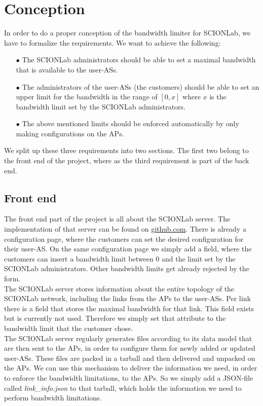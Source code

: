 \chapter{Conception}
In order to do a proper conception of the bandwidth limiter for \acs{SCIONLab}, we have to formalize the requirements. We want to achieve the following:

\begin{enumerate}
\item[$\bullet$]The \acs{SCIONLab} administrators should be able to set a maximal bandwidth that is available to the user-\acsp{AS}.
\item[$\bullet$]The administrators of the user-\acsp{AS} (the customers) should be able to set an upper limit for the bandwidth in the range of $[0,x]$ where $x$ is the bandwidth limit set by the \acs{SCIONLab} administrators.
\item[$\bullet$] The above mentioned limits should be enforced automatically by only making configurations on the \acsp{AP}.
\end{enumerate}

We split up these three requirements into two sections. The first two belong to the front end of the project, where as the third requirement is part of the back end.

\section{Front end}

The front end part of the project is all about the \acs{SCIONLab} server. The implementation of that server can be found on \href{https://github.com/netsec-ethz/scionlab}{github.com}. There is already a configuration page, where the customers can set the desired configuration for their user-\acs{AS}. On the same configuration page we simply add a field, where the customers can insert a bandwidth limit between 0 and the limit set by the \acs{SCIONLab} administrators. Other bandwidth limits get already rejected by the form.
\\
The \acs{SCIONLab} server stores information about the entire topology of the \acs{SCIONLab} network, including the links from the \acsp{AP} to the user-\acsp{AS}. Per link there is a field that stores the maximal bandwidth for that link. This field exists but is currently not used. Therefore we simply set that attribute to the bandwidth limit that the customer chose.
\\
The \acs{SCIONLab} server regularly generates files according to its data model that are then sent to the \acsp{AP}, in order to configure them for newly added or updated user-\acsp{AS}. These files are packed in a tarball and then delivered and unpacked on the \acsp{AP}. We can use this mechanism to deliver the information we need, in order to enforce the bandwidth limitations, to the \acsp{AP}. So we simply add a \ac{JSON}-file called \textit{link\_info.json} to that tarball, which holds the information we need to perform bandwidth limitations.

